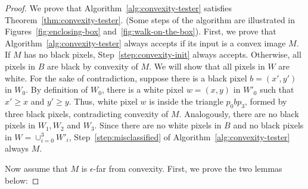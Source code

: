 \documentclass[11pt,english]{article}
\numberwithin{figure}{section}
\newcommand{\eps}{{\epsilon}}
\begin{document}
\begin{proof}
We prove that Algorithm~\ref{alg:convexity-tester} satisfies
Theorem~\ref{thm:convexity-tester}. (Some steps of the algorithm are illustrated in Figures~\ref{fig:enclosing-box} and~\ref{fig:walk-on-the-box}).
First, we prove that Algorithm~\ref{alg:convexity-tester} always accepts if its input is a convex image $M$. If $M$ has no black pixels, Step~\ref{step:convexity-init} always accepts. Otherwise, all pixels in $B$ are black by convexity of $M$.
We will show that all pixels in $W$ are
white.
For the sake of contradiction, suppose there is a black pixel $b=(x',y')$ in $W_0$. By definition of $W_0$, there is a white pixel $w=(x,y)$ in $W'_0$ such that $x'\geq x$ and $y'\geq y$. Thus, white pixel $w$ is inside the
triangle $p_0 b p_3$, formed by three black pixels, contradicting convexity of $M$. Analogously, there are no black pixels in $W_1,W_2$ and $W_3$. Since there are no white pixels in $B$ and no black pixels in $W=\cup_{i=0}^{3} W'_i$,
Step~\ref{step:misclassified} of Algorithm~\ref{alg:convexity-tester} always $M$.

Now assume that $M$ is $\eps$-far from convexity. First, we prove the two
lemmas below:


\end{proof}
\end{document}
